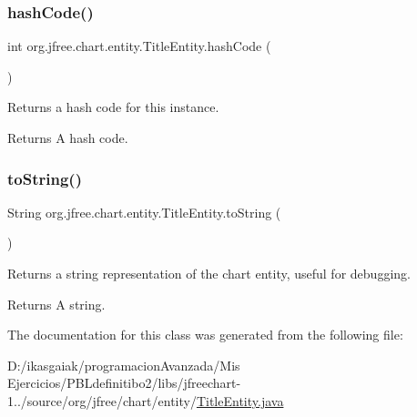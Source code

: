 \subsubsection{\texorpdfstring{hash\+Code()}{hashCode()}}
{\footnotesize\ttfamily int org.\+jfree.\+chart.\+entity.\+Title\+Entity.\+hash\+Code (\begin{DoxyParamCaption}{ }\end{DoxyParamCaption})}

Returns a hash code for this instance.

\begin{DoxyReturn}{Returns}
A hash code. 
\end{DoxyReturn}
\mbox{\label{classorg_1_1jfree_1_1chart_1_1entity_1_1_title_entity_aa5cfaf1307f235e3a2a0d5d309a9db84}} 
\subsubsection{\texorpdfstring{to\+String()}{toString()}}
{\footnotesize\ttfamily String org.\+jfree.\+chart.\+entity.\+Title\+Entity.\+to\+String (\begin{DoxyParamCaption}{ }\end{DoxyParamCaption})}

Returns a string representation of the chart entity, useful for debugging.

\begin{DoxyReturn}{Returns}
A string. 
\end{DoxyReturn}


The documentation for this class was generated from the following file\+:\begin{DoxyCompactItemize}
\item 
D\+:/ikasgaiak/programacion\+Avanzada/\+Mis Ejercicios/\+P\+B\+Ldefinitibo2/libs/jfreechart-\/1../source/org/jfree/chart/entity/\mbox{\hyperlink{_title_entity_8java}{Title\+Entity.\+java}}\end{DoxyCompactItemize}

